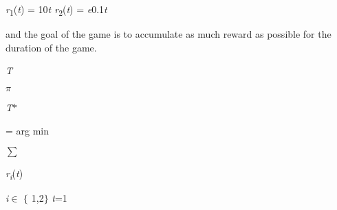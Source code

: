 \documentclass[12pt,twoside]{article}
\begin{document}
\begin{adjustwidth}{3.48in}{2.99in}
\begin{Center}
{\fontsize{10pt}{12.0pt}\selectfont \textit{r}\textsubscript{1}(\textit{t}) = 10\textit{t r}\textsubscript{2}(\textit{t}) = \textit{e}0.1\textit{t}\par}
\end{Center}\par

\end{adjustwidth}

\begin{adjustwidth}{0.58in}{0.0in}
{\fontsize{10pt}{12.0pt}\selectfont and the goal of the game is to accumulate as much reward as possible for the duration of the game.\par}\par

\end{adjustwidth}

\begin{adjustwidth}{1.18in}{0.0in}
\begin{Center}
{\fontsize{7pt}{8.4pt}\selectfont \textit{T}\par}
\end{Center}\par

\end{adjustwidth}

\begin{adjustwidth}{0.85in}{0.35in}
\begin{Center}
{\fontsize{10pt}{12.0pt}\selectfont \textit{$ \pi $ }{\fontsize{7pt}{8.4pt}\selectfont \textit{T}$\ast$   {\fontsize{10pt}{12.0pt}\selectfont = arg  min\   {\fontsize{14pt}{16.8pt}\selectfont $ \sum $  {\fontsize{10pt}{12.0pt}\selectfont \textit{r\textsubscript{i}}(\textit{t})\par}\par}\par}\par}\par}
\end{Center}\par

\end{adjustwidth}

\begin{adjustwidth}{3.71in}{0.0in}
\begin{FlushLeft}
{\fontsize{7pt}{8.4pt}\selectfont \textit{i}$ \in $ $ \{ $ 1,2$ \} $  \textit{t}=1\par}
\end{FlushLeft}\par

\end{adjustwidth}
\end{document}

